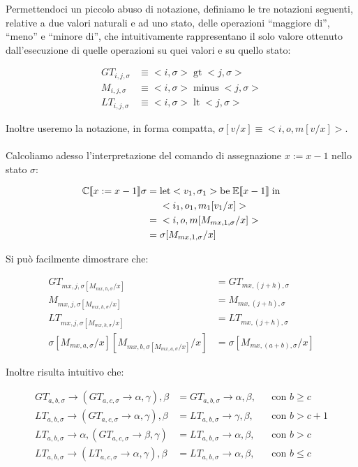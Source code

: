     Permettendoci un piccolo abuso di notazione, definiamo le tre notazioni seguenti, relative a due valori naturali e ad uno stato, delle operazioni ``maggiore di'', ``meno'' e ``minore di'', che intuitivamente rappresentano il solo valore ottenuto dall'esecuzione di quelle operazioni su quei valori e su quello stato:
    
    \begin{align*}
        GT_{i,j,\sigma} &\equiv <i,\sigma>\; \mbox{gt}\; <j, \sigma>\\
        M_{i,j,\sigma} &\equiv <i,\sigma>\; \mbox{minus}\; <j, \sigma>\\
        LT_{i,j,\sigma} &\equiv <i,\sigma>\; \mbox{lt}\; <j, \sigma>
    \end{align*}
    
    Inoltre useremo la notazione, in forma compatta, $\sigma[v/x] \equiv <i,o,m[v/x]>$.\\
    \\
    Calcoliamo adesso l'interpretazione del comando di assegnazione $x:=x-1$ nello stato $\sigma$:
    
    \begin{align*}
        \mathbb{C}\llbracket x:=x-1 \rrbracket\sigma =\;& \mbox{let} <v_1,\sigma_1> \mbox{be}\; \mathbb{E}\llbracket x-1 \rrbracket\; \mbox{in}\\
        &<i_1,o_1,m_1[v_1/x]>\\
        =\;& <i,o,m[M_{mx,1,\sigma}/x]>\\
        =\;& \sigma[M_{mx,1,\sigma}/x]
    \end{align*}
    
    Si può facilmente dimostrare che:
    
    \begin{align*}
        GT_{mx,j,\sigma[M_{mx,h,\sigma}/x]} &= GT_{mx, (j+h), \sigma}\\
        M_{mx,j,\sigma[M_{mx,h,\sigma}/x]} &= M_{mx, (j+h), \sigma}\\
        LT_{mx,j,\sigma[M_{mx,h,\sigma}/x]} &= LT_{mx, (j+h), \sigma}\\
        \sigma[M_{mx,a,\sigma}/x][M_{mx,b,\sigma[M_{mx,a,\sigma}/x]}/x] &= \sigma[M_{mx,(a+b),\sigma}/x]
    \end{align*}
    
    Inoltre risulta intuitivo che:
    
    \begin{align*}
        GT_{a,b,\sigma} \rightarrow (GT_{a,c,\sigma} \rightarrow \alpha, \gamma), \beta &= GT_{a,b,\sigma} \rightarrow \alpha, \beta, &&\mbox{con $b\geq c$}\\
        LT_{a,b,\sigma} \rightarrow (GT_{a,c,\sigma} \rightarrow \alpha, \gamma), \beta &= LT_{a,b,\sigma} \rightarrow \gamma, \beta, &&\mbox{con $b > c+1$}\\
        LT_{a,b,\sigma} \rightarrow \alpha, (GT_{a,c,\sigma} \rightarrow \beta, \gamma) &= LT_{a,b,\sigma} \rightarrow \alpha, \beta, &&\mbox{con $b > c$}\\
        LT_{a,b,\sigma} \rightarrow (LT_{a,c,\sigma} \rightarrow \alpha, \gamma), \beta &= LT_{a,b,\sigma} \rightarrow \alpha, \beta, &&\mbox{con $b\leq c$}
    \end{align*}
    
